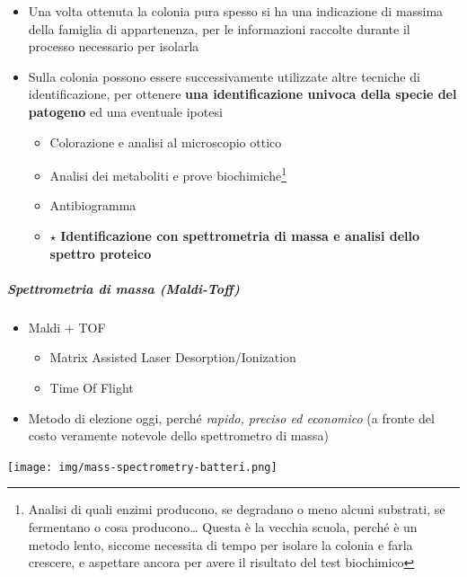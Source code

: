 \documentclass[italian,]{article}
\providecommand{\tightlist}{%
  \setlength{\itemsep}{0pt}\setlength{\parskip}{0pt}}
\begin{document}
\begin{itemize}
\tightlist
\item
  Una volta ottenuta la colonia pura spesso si ha una indicazione di
  massima della famiglia di appartenenza, per le informazioni raccolte
  durante il processo necessario per isolarla
\item
  Sulla colonia possono essere successivamente utilizzate altre tecniche
  di identificazione, per ottenere \textbf{una identificazione univoca
  della specie del patogeno} ed una eventuale ipotesi

  \begin{itemize}
  \tightlist
  \item
    Colorazione e analisi al microscopio ottico
  \item
    Analisi dei metaboliti e prove biochimiche\footnote{Analisi di quali
      enzimi producono, se degradano o meno alcuni substrati, se
      fermentano o cosa producono\ldots{} Questa è la vecchia scuola,
      perché è un metodo lento, siccome necessita di tempo per isolare
      la colonia e farla crescere, e aspettare ancora per avere il
      risultato del test biochimico}
  \item
    Antibiogramma
  \item
    \(\star\) \textbf{Identificazione con spettrometria di massa e
    analisi dello spettro proteico}
  \end{itemize}
\end{itemize}

\hypertarget{spettrometria-di-massa-maldi-toff}{%
\subparagraph{Spettrometria di massa
(Maldi-Toff)}\label{spettrometria-di-massa-maldi-toff}}

\begin{itemize}
\tightlist
\item
  Maldi + TOF

  \begin{itemize}
  \tightlist
  \item
    Matrix Assisted Laser Desorption/Ionization
  \item
    Time Of Flight
  \end{itemize}
\item
  Metodo di elezione oggi, perché \emph{rapido, preciso ed economico} (a
  fronte del costo veramente notevole dello spettrometro di massa)
\end{itemize}

\texttt{[image: img/mass-spectrometry-batteri.png]}~
\end{document}
